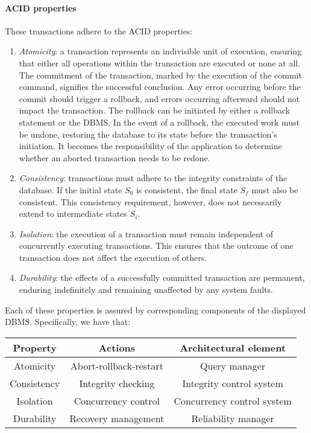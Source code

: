 \paragraph*{ACID properties}
These transactions adhere to the ACID properties:
\begin{enumerate}
    \item \textit{Atomicity}: a transaction represents an indivisible unit of execution, ensuring that either all operations within the transaction are executed or none at all.
        The commitment of the transaction, marked by the execution of the commit command, signifies the successful conclusion. 
        Any error occurring before the commit should trigger a rollback, and errors occurring afterward should not impact the transaction.        
        The rollback can be initiated by either a rollback statement or the DBMS.
        In the event of a rollback, the executed work must be undone, restoring the database to its state before the transaction's initiation.
        It becomes the responsibility of the application to determine whether an aborted transaction needs to be redone.
    \item \textit{Consistency}: transactions must adhere to the integrity constraints of the database.
        If the initial state $S_0$ is consistent, the final state $S_f$ must also be consistent. 
        This consistency requirement, however, does not necessarily extend to intermediate states $S_i$.
    \item \textit{Isolation}: the execution of a transaction must remain independent of concurrently executing transactions. 
        This ensures that the outcome of one transaction does not affect the execution of others.
    \item \textit{Durability}: the effects of a successfully committed transaction are permanent, enduring indefinitely and remaining unaffected by any system faults.
\end{enumerate}
Each of these properties is assured by corresponding components of the displayed DBMS. 
Specifically, we have that:
\begin{table}[H]
    \centering
    \begin{tabular}{c|c|c}
    \textbf{Property} & \textbf{Actions}       & \textbf{Architectural element} \\ \hline
    Atomicity         & Abort-rollback-restart & Query manager                  \\
    Consistency       & Integrity checking     & Integrity control system       \\
    Isolation         & Concurrency control    & Concurrency control system     \\
    Durability        & Recovery management    & Reliability manager           
    \end{tabular}
\end{table}

